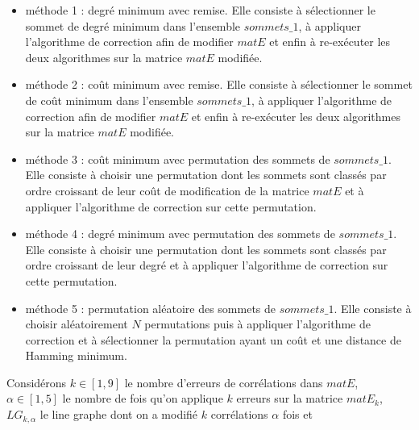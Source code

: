 \documentclass[onecolumn, 12pt]{book}
\begin{document}
\begin{itemize}
\item m\'ethode 1 : degr\'e minimum avec remise.\newline
Elle consiste \`a s\'electionner le sommet de degr\'e minimum dans l'ensemble $sommets\_1$, \`a appliquer l'algorithme de correction afin de modifier $matE$ et enfin \`a re-ex\'ecuter les deux algorithmes sur la matrice $matE$ modifi\'ee.
\item m\'ethode 2 : co\^ut minimum avec remise. \newline
Elle consiste \`a s\'electionner le sommet de co\^ut minimum dans l'ensemble $sommets\_1$, \`a appliquer l'algorithme de correction afin de modifier $matE$ et enfin \`a re-ex\'ecuter les deux algorithmes sur la matrice $matE$ modifi\'ee.
\item m\'ethode 3 : co\^ut minimum avec permutation des sommets de $sommets\_1$. \newline
Elle consiste \`a choisir une permutation dont les sommets sont class\'es par ordre croissant de leur co\^ut  de modification de la matrice $matE$ et \`a appliquer l'algorithme de correction sur cette permutation.
\item m\'ethode 4 :  degr\'e minimum avec  permutation des sommets de $sommets\_1$. \newline
Elle consiste \`a choisir une permutation dont les sommets sont class\'es par ordre croissant de leur degr\'e et \`a appliquer l'algorithme de correction sur cette permutation.
\item m\'ethode 5 : permutation al\'eatoire des sommets de $sommets\_1$. \newline
Elle consiste \`a choisir al\'eatoirement $N$ permutations puis \`a appliquer l'algorithme de correction et \`a s\'electionner la permutation ayant un co\^ut et une distance de Hamming minimum.
\end{itemize}
Consid\'erons 
 $k \in [1, 9]$ le nombre d'erreurs de corr\'elations dans $matE$,
  $\alpha \in [1, 5]$ le nombre de fois qu'on applique $k$ erreurs sur la matrice $matE_k$,  
 $LG_{k, \alpha}$ le line graphe dont on a modifi\'e $k$ corr\'elations $\alpha$ fois et 
\end{document}
